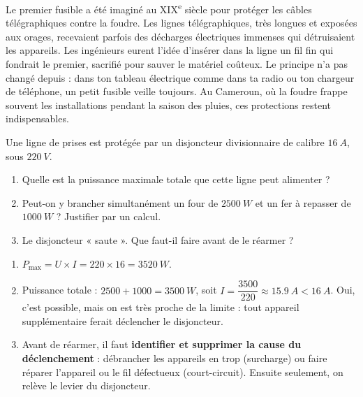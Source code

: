 \documentclass[11pt]{article}
\begin{document}
\begin{savaistu}
Le premier fusible a été imaginé au XIX\textsuperscript{e} siècle pour protéger les câbles télégraphiques contre la foudre. Les lignes télégraphiques, très longues et exposées aux orages, recevaient parfois des décharges électriques immenses qui détruisaient les appareils. Les ingénieurs eurent l'idée d'insérer dans la ligne un fil fin qui fondrait le premier, sacrifié pour sauver le matériel coûteux. Le principe n'a pas changé depuis : dans ton tableau électrique comme dans ta radio ou ton chargeur de téléphone, un petit fusible veille toujours. Au Cameroun, où la foudre frappe souvent les installations pendant la saison des pluies, ces protections restent indispensables.
\end{savaistu}

\begin{exercice}
Une ligne de prises est protégée par un disjoncteur divisionnaire de calibre $\SI{16}{A}$, sous $\SI{220}{V}$.
\begin{enumerate}
\item Quelle est la puissance maximale totale que cette ligne peut alimenter ?
\item Peut-on y brancher simultanément un four de $\SI{2500}{W}$ et un fer à repasser de $\SI{1000}{W}$ ? Justifier par un calcul.
\item Le disjoncteur « saute ». Que faut-il faire avant de le réarmer ?
\end{enumerate}
\end{exercice}

\begin{corrige}
\begin{enumerate}
\item $P_{\max} = U \times I = 220 \times 16 = \SI{3520}{W}$.
\item Puissance totale : $2500 + 1000 = \SI{3500}{W}$, soit $I = \dfrac{3500}{220} \approx \SI{15,9}{A} < \SI{16}{A}$. Oui, c'est possible, mais on est très proche de la limite : tout appareil supplémentaire ferait déclencher le disjoncteur.
\item Avant de réarmer, il faut \textbf{identifier et supprimer la cause du déclenchement} : débrancher les appareils en trop (surcharge) ou faire réparer l'appareil ou le fil défectueux (court-circuit). Ensuite seulement, on relève le levier du disjoncteur.
\end{enumerate}
\end{corrige}
\end{document}
